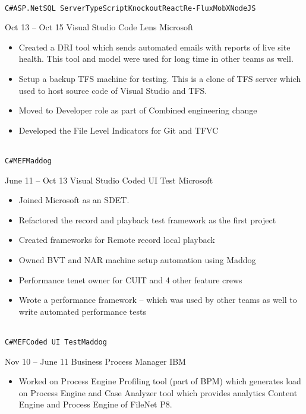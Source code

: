 \documentclass[9pt]{developercv} %
\begin{document}
\begin{entrylist}
{\begin{itemize}
        \end{itemize}
		\\ \texttt{C\#}\slashsep\texttt{ASP.Net}\slashsep\texttt{SQL Server}\slashsep\texttt{TypeScript}\slashsep\texttt{Knockout}\slashsep\texttt{React}\slashsep\texttt{Re-Flux}\slashsep\texttt{MobX}\slashsep\texttt{NodeJS}}
	\entry
		{Oct 13 -- Oct 15}
		{Visual Studio Code Lens}
		{Microsoft}
		{\begin{itemize}
          \item Created a DRI tool which sends automated emails with reports of live site health. This tool and model were used for long time in other teams as well.
          \item Setup a backup TFS machine for testing. This is a clone of TFS server which used to host source code of Visual Studio and TFS.
          \item Moved to Developer role as part of Combined engineering change
          \item Developed the File Level Indicators for Git and TFVC
        \end{itemize}
		\\ \texttt{C\#}\slashsep\texttt{MEF}\slashsep\texttt{Maddog}}
	\entry
		{June 11 -- Oct 13}
		{Visual Studio Coded UI Test}
		{Microsoft}
		{\begin{itemize}
          \item Joined Microsoft as an SDET.
          \item Refactored the record and playback test framework as the first project
          \item Created frameworks for Remote record local playback
          \item Owned BVT and NAR machine setup automation using Maddog
          \item Performance tenet owner for CUIT and 4 other feature crews
          \item Wrote a performance framework – which was used by other teams as well to write automated performance tests
        \end{itemize}
		\\ \texttt{C\#}\slashsep\texttt{MEF}\slashsep\texttt{Coded UI Test}\slashsep\texttt{Maddog}}
	\entry
		{Nov 10 -- June 11}
		{Business Process Manager}
		{IBM}
		{\begin{itemize}
          \item Worked on Process Engine Profiling tool (part of BPM) which generates load on Process Engine and Case Analyzer tool which provides analytics Content Engine and Process Engine of FileNet P8.

\end{itemize}}
\end{entrylist}
\end{document}
